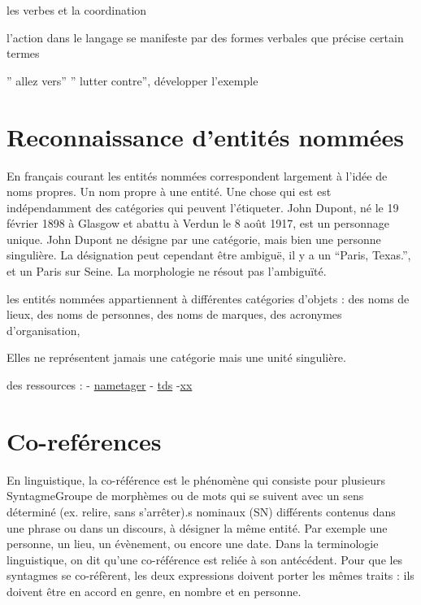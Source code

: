 \documentclass[
  letterpaper,
  DIV=11,
  numbers=noendperiod]{scrreprt}
\begin{document}
les verbes et la coordination

l'action dans le langage se manifeste par des formes verbales que
précise certain termes

'' allez vers'' '' lutter contre'', développer l'exemple

\section{Reconnaissance d'entités
nommées}\label{reconnaissance-dentituxe9s-nommuxe9es}

En français courant les entités nommées correspondent largement à l'idée
de noms propres. Un nom propre à une entité. Une chose qui est est
indépendamment des catégories qui peuvent l'étiqueter. John Dupont, né
le 19 février 1898 à Glasgow et abattu à Verdun le 8 août 1917, est un
personnage unique. John Dupont ne désigne par une catégorie, mais bien
une personne singulière. La désignation peut cependant être ambiguë, il
y a un ``Paris, Texas.'', et un Paris sur Seine. La morphologie ne
résout pas l'ambiguïté.

les entités nommées appartiennent à différentes catégories d'objets :
des noms de lieux, des noms de personnes, des noms de marques, des
acronymes d'organisation,

Elles ne représentent jamais une catégorie mais une unité singulière.

des ressources : -
\href{https://cran.r-project.org/web/packages/nametagger/nametagger.pdf}{nametager}
-
\href{https://towardsdatascience.com/quick-guide-to-entity-recognition-and-geocoding-with-r-c0a915932895\%20-\%20\%5Btester\%20cette\%20solution\%20\%5D(https://github.com/trinker/entity/)tester\%20cette\%20solution}{tds}
-\href{https://www.smalsresearch.be/named-entity-recognition-une-application-du-nlp-utile/}{xx}

\section{Co-reférences}\label{co-refuxe9rences}

En linguistique, la co-référence est le phénomène qui consiste pour
plusieurs Syntagme{Groupe de morphèmes ou de mots qui se suivent avec un
sens déterminé (ex. relire, sans s'arrêter).}s nominaux (SN) différents
contenus dans une phrase ou dans un discours, à désigner la même entité.
Par exemple une personne, un lieu, un évènement, ou encore une date.
Dans la terminologie linguistique, on dit qu'une co-référence est reliée
à son antécédent. Pour que les syntagmes se co-réfèrent, les deux
expressions doivent porter les mêmes traits : ils doivent être en accord
en genre, en nombre et en personne.
\end{document}
